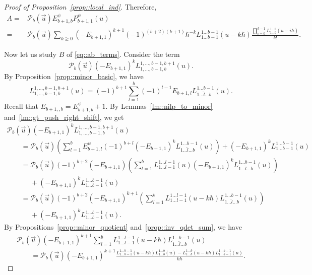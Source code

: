 \documentclass[10pt,a4paper]{article}
\numberwithin{equation}{section}
\newcommand{\calP}{\mathcal{P}}
\begin{document}
\begin{proof}[Proof of Proposition~\ref{prop::local_ind}]
		Therefore,
		\begin{align}
				A = {}& \calP_{b}(\vec{u}) E_{b+1,b}^{\psi} P_{b+1,1}^{\psi}(u) \nonumber\\
				={}& \calP_{b}(\vec{u}) \sum\limits_{k\geq 0} (-E_{b+1,1})^{k+1} (-1)^{(b+2)(k+1)} \hbar^{-k} L_{1\dots b-1}^{1\dots b-1}(u-k\hbar) \frac{\prod_{i=0}^{k-1} L_{1\dots b}^{1\dots b}(u-i\hbar)}{k!}.			\label{eq::a_term}
		\end{align}
		
		Now let us study $B$ of \eqref{eq::ab_terms}. Consider the term
		\[
		\calP_{b}(\vec{u})(-E_{b+1,1})^k L_{1,\dots,b-1,b}^{1,\dots,b-1,b+1}(u).
		\]
		By Proposition~\ref{prop::minor_basic}, we have
		\[
		L_{1,\dots,b-1,b}^{1,\dots,b-1,b+1}(u) = (-1)^{b+1} \sum\limits_{l=1}^{b} (-1)^{l-1} E_{b+1,l} L_{1\dots \hat{l} \dots b}^{1\dots b-1}(u).
		\]
		Recall that $E_{b+1,,b} = E_{b+1,b}^{\psi} + 1$. By Lemmas~\ref{lm::nilp_to_minor} and~\ref{lm::gt_push_right_shift}, we get
		\begin{gather*}
			\calP_{b}(\vec{u})(-E_{b+1,1})^k L_{1,\dots,b-1,b}^{1,\dots,b-1,b+1}(u) \\
			\qquad= \calP_{b}(\vec{u}) \left( \sum\limits_{l=1}^{b} E_{b+1,l}^{\psi} (-1)^{b+l} (-E_{b+1,1})^k L_{1\dots \hat{l} \dots b}^{1\dots b-1}(u) \right)+ (-E_{b+1,1})^k L_{1\dots b-1}^{1\dots b-1}(u) \\
			\qquad= \calP_{b}(\vec{u})(-1)^{b+2} (-E_{b+1,1}) \left( \sum\limits_{l=1}^{b} L_{1\dots l-1}^{1\dots l-1}(u) (-E_{b+1,1})^k L_{1\dots \hat{l} \dots b}^{1\dots b-1}(u) \right)\\
\phantom{\qquad= }{} + (-E_{b+1,1})^k L_{1\dots b-1}^{1\dots b-1}(u) \\
		\qquad	= \calP_{b}(\vec{u})(-1)^{b+2} (-E_{b+1,1})^{k+1}\left( \sum\limits_{l=1}^{b} L_{1\dots l-1}^{1\dots l-1}(u-k\hbar) L_{1\dots \hat{l} \dots b}^{1\dots b-1}(u) \right)\\
\phantom{\qquad= }{} + (-E_{b+1,1})^k L_{1\dots b-1}^{1\dots b-1}(u).
		\end{gather*}
		By Propositions~\ref{prop::minor_quotient} and~\ref{prop::inv_qdet_sum}, we have
		\begin{gather*}
			\calP_{b}(\vec{u}) (-E_{b+1,1})^{k+1} \sum\limits_{l=1}^{b} L_{1\dots l-1}^{1\dots l-1}(u-k\hbar) L_{1\dots \hat{l} \dots b}^{1\dots b-1}(u) \\
			\qquad=\calP_{b}(\vec{u}) (-E_{b+1,1})^{k+1} \frac{L_{1\dots b-1}^{1\dots b-1}(u-k\hbar) L_{1\dots b}^{1\dots b}(u) - L_{1\dots b}^{1\dots b}(u-k\hbar) L_{1\dots b-1}^{1\dots b-1}(u)}{k\hbar}.

\end{gather*}
\end{proof}
\end{document}
